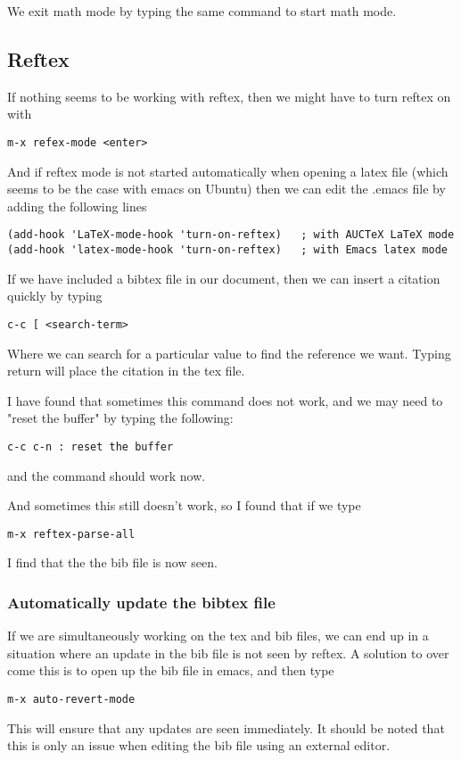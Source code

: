 \documentclass[a4paper, 10pt]{article}
\begin{document}
We exit math mode by typing the same command to start math mode.

\subsection*{Reftex}

If nothing seems to be working with reftex, then we might have to turn
reftex on with 
\begin{verbatim}
m-x refex-mode <enter>
\end{verbatim}
And if reftex mode is not started automatically when opening a latex
file (which seems to be the case with emacs on Ubuntu) then we can
edit the .emacs file by adding the following lines
\begin{verbatim}
(add-hook 'LaTeX-mode-hook 'turn-on-reftex)   ; with AUCTeX LaTeX mode
(add-hook 'latex-mode-hook 'turn-on-reftex)   ; with Emacs latex mode
\end{verbatim}
If we have included a bibtex file in our document, then we can insert a citation quickly by typing
\begin{verbatim}
c-c [ <search-term>
\end{verbatim}
Where we can search for a particular value to find the reference we want. Typing return will place the citation in the tex file.
  
I have found that sometimes this command does not work, and we may
need to "reset the buffer" by typing the following:
\begin{verbatim}
c-c c-n : reset the buffer
\end{verbatim}
and the command should work now.

And sometimes this still doesn't work, so I found that if we type
\begin{verbatim}
m-x reftex-parse-all
\end{verbatim}
I find that the the bib file is now seen.


\subsubsection*{Automatically update the bibtex file}
\label{sec:autom-update-bibt}

If we are simultaneously working on the tex and bib files, we can end
up in a situation where an update in the bib file is not seen by
reftex. A solution to over come this is to open up the bib file in
emacs, and then type 
\begin{verbatim}
m-x auto-revert-mode
\end{verbatim}
This will ensure that any updates are seen immediately. It should be
noted that this is only an issue when editing the bib file using an
external editor. 
\end{document}
